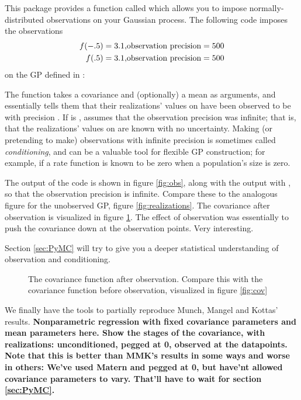 \documentclass{manual}
\begin{document}
This package provides a function called  which allows you to impose normally-distributed observations on your Gaussian process. The following code imposes the observations
\begin{eqnarray}
	f(-.5) = 3.1, & \textup{observation precision}=500\\
	f(.5) = 3.1, & \textup{observation precision}=500
\end{eqnarray}
on the GP defined in :
 

The function  takes a covariance   and (optionally) a mean  as arguments, and essentially tells them that their realizations' values on  have been observed to be  with precision . If  is ,  assumes that the observation precision was infinite; that is, that the realizations' values on  are known with no uncertainty. Making (or pretending to make) observations with infinite precision is sometimes called \emph{conditioning}, and can be a valuable tool for flexible GP construction; for example, if a rate function is known to be zero when a population's size is zero.

The output of the code is shown in figure \ref{fig:obs}, along with the output with , so that the observation precision is infinite. Compare these to the analogous figure for the unobserved GP, figure \ref{fig:realizations}. The covariance after observation is visualized in figure \ref{fig:obscov}. The effect of observation was essentially to push the covariance down at the observation points. Very interesting.

Section \ref{sec:PyMC} will try to give you a deeper statistical understanding of observation and conditioning. 

\begin{figure}
	\centering
	\caption{The covariance function after observation. Compare this with the covariance function before observation, visualized in figure \ref{fig:cov} }
	\label{fig:obscov}
\end{figure}

We finally have the tools to partially reproduce Munch, Mangel and Kottas' results. \textbf{Nonparametric regression with fixed covariance parameters and mean parameters here. Show the stages of the covariance, with realizations: unconditioned, pegged at 0, observed at the datapoints. Note that this is better than MMK's results in some ways and worse in others: We've used Matern and pegged at 0, but have'nt allowed covariance parameters to vary. That'll have to wait for section \ref{sec:PyMC}.}
\end{document}
